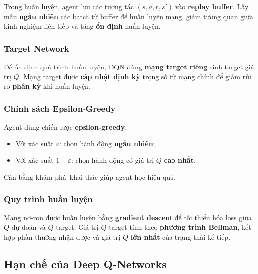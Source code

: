 \begin{phuongphap}[title={Bộ đệm kinh nghiệm}]
Trong huấn luyện, agent lưu các tương tác $(s, a, r, s')$ vào \textbf{replay buffer}.
Lấy mẫu \textbf{ngẫu nhiên} các batch từ buffer để huấn luyện mạng, giảm tương quan giữa kinh nghiệm liên tiếp và tăng \textbf{ổn định} huấn luyện.
\end{phuongphap}

\subsubsection{Target Network}

\begin{phuongphap}[title={Mạng target}]
Để ổn định quá trình huấn luyện, DQN dùng \textbf{mạng target riêng} sinh target giá trị $Q$.
Mạng target được \textbf{cập nhật định kỳ} trọng số từ mạng chính để giảm rủi ro \textbf{phân kỳ} khi huấn luyện.
\end{phuongphap}

\subsubsection{Chính sách Epsilon-Greedy}

\begin{phuongphap}[title={Epsilon-Greedy Policy}]
Agent dùng chiến lược \textbf{epsilon-greedy}:
\begin{itemize}
  \item Với xác suất $\varepsilon$: chọn hành động \textbf{ngẫu nhiên};
  \item Với xác suất $1-\varepsilon$: chọn hành động có giá trị $Q$ \textbf{cao nhất}.
\end{itemize}
Cân bằng khám phá--khai thác giúp agent học hiệu quả.
\end{phuongphap}

\subsubsection{Quy trình huấn luyện}

\begin{phuongphap}[title={Training Process}]
Mạng nơ-ron được huấn luyện bằng \textbf{gradient descent} để tối thiểu hóa loss giữa $Q$ dự đoán và $Q$ target.
Giá trị $Q$ target tính theo \textbf{phương trình Bellman}, kết hợp phần thưởng nhận được và giá trị $Q$ \textbf{lớn nhất} của trạng thái kế tiếp.
\end{phuongphap}

\subsection{Hạn chế của Deep Q-Networks}

